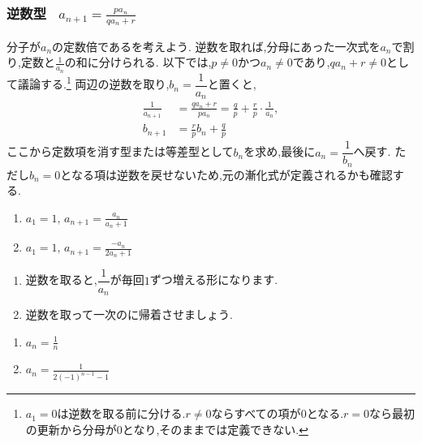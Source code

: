 
\subsubsection{\texorpdfstring{逆数型  \, $\displaystyle a_{n+1}=\frac{pa_n}{qa_n+r}$}{逆数型}}\label{節：逆数型}
    分子が$a_n$の定数倍であるを考えよう.
    逆数を取れば,分母にあった一次式を$a_n$で割り,定数と$\frac1{a_n}$の和に分けられる.
    以下では,$p\ne0$かつ$a_n\ne0$であり,$qa_n+r\ne0$として議論する.\footnote{$a_1=0$は逆数を取る前に分ける.$r\ne0$ならすべての項が$0$となる.$r=0$なら最初の更新から分母が$0$となり,そのままでは定義できない.}
    両辺の逆数を取り,$b_n=\dfrac{1}{a_n}$と置くと,
    \begin{align*}
      \frac{1}{a_{n+1}}&=\frac{qa_n+r}{pa_n}
        =\frac{q}{p}+\frac{r}{p}\cdot\frac{1}{a_n},\\
      b_{n+1}&=\frac{r}{p}b_n+\frac{q}{p}
    \end{align*}
    ここから定数項を消す型または等差型として$b_n$を求め,最後に$a_n=\dfrac{1}{b_n}$へ戻す.
    ただし$b_n=0$となる項は逆数を戻せないため,元の漸化式が定義されるかも確認する.

    \noindent {}\par\nobreak
    \begin{enumerate}[label=(\arabic*),parsep=3pt,format=\bookitemlink{example-reciprocal-1}{problem}{answer}]
      \item $\displaystyle a_1=1,\, a_{n+1}=\frac{a_n}{a_n+1}$
      \item $\displaystyle a_1=1,\, a_{n+1}=\frac{-a_n}{2a_n+1}$
    \end{enumerate}

    \noindent{}\par\nobreak
    \begin{enumerate}[label=(\arabic*),parsep=3pt,format=\bookitemlink{example-reciprocal-1}{hint}{problem}]
      \item 逆数を取ると,$\dfrac{1}{a_n}$が毎回$1$ずつ増える形になります.
      \item 逆数を取って一次のに帰着させましょう.
    \end{enumerate}

    \noindent{}\par\nobreak
    \begin{enumerate}[label=(\arabic*),parsep=3pt,format=\bookitemlink{example-reciprocal-1}{answer}{problem}]
      \item $\displaystyle a_n=\frac{1}{n}$
      \item $\displaystyle a_n=\frac{1}{2(-1)^{n-1}-1}$
    \end{enumerate}

